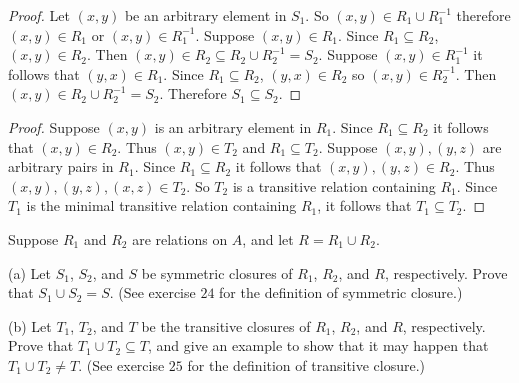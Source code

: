 \begin{proof}
    Let $(x, y)$ be an arbitrary element in $S_1$.
    So $(x, y) \in R_1 \cup R_1^{-1}$ therefore $(x, y) \in R_1$ or $(x, y) \in R_1^{-1}$.
    Suppose $(x, y) \in R_1$. Since $R_1 \subseteq R_2$, $(x, y) \in R_2$.
    Then $(x, y) \in R_2 \subseteq R_2 \cup R_2^{-1} = S_2$.
    Suppose $(x, y) \in R_1^{-1}$ it follows that $(y, x) \in R_1$.
    Since $R_1 \subseteq R_2$, $(y, x) \in R_2$ so $(x, y) \in R_2^{-1}$.
    Then $(x, y) \in R_2 \cup R_2^{-1} = S_2$.
    Therefore $S_1 \subseteq S_2$.
\end{proof}

\begin{proof}
    Suppose $(x, y)$ is an arbitrary element in $R_1$.
    Since $R_1 \subseteq R_2$ it follows that $(x, y) \in R_2$.
    Thus $(x, y) \in T_2$ and $R_1 \subseteq T_2$.
    Suppose $(x, y), (y, z)$ are arbitrary pairs in $R_1$.
    Since $R_1 \subseteq R_2$ it follows that $(x, y), (y, z) \in R_2$.
    Thus $(x, y), (y, z), (x, z) \in T_2$.
    So $T_2$ is a transitive relation containing $R_1$.
    Since $T_1$ is the minimal transitive relation containing $R_1$,
        it follows that $T_1 \subseteq T_2$.
\end{proof}

\begin{tcolorbox}[title=Problem 27, breakable]
    Suppose $R_1$ and $R_2$ are relations on $A$, and let $R = R_1 \cup R_2$.

    (a) Let $S_1$, $S_2$, and $S$ be symmetric closures of $R_1$, $R_2$, and $R$,
        respectively. Prove that $S_1 \cup S_2 = S$. (See exercise $24$ for the definition
        of symmetric closure.)

    (b) Let $T_1$, $T_2$, and $T$ be the transitive closures of $R_1$, $R_2$, and $R$,
        respectively. Prove that $T_1 \cup T_2 \subseteq T$, and give an example to 
        show that it may happen that $T_1 \cup T_2 \not= T$. (See exercise $25$ for 
        the definition of transitive closure.)
\end{tcolorbox}

